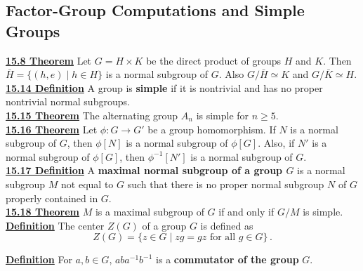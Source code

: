 \documentclass[12pt, letterpaper]{article}
\begin{document}
\subsection{Factor-Group Computations and Simple Groups}

\noindent \underline{\bf 15.8 Theorem} Let $G = H \times K$ be the direct product of groups $H$ and $K$. Then $\bar{H} = \{(h,e) \; | \; h \in H\}$ is a normal subgroup of $G$. Also $G / \bar{H} \simeq K$ and $G / \bar{K} \simeq H$. \\

\noindent \underline{\bf 15.14 Definition} A group is {\bf simple} if it is nontrivial and has no proper nontrivial normal subgroups. \\

\noindent \underline{\bf 15.15 Theorem} The alternating group $A_n$ is simple for $n \geq 5$. \\

\noindent \underline{\bf 15.16 Theorem} Let $\phi : G \rightarrow G'$ be a group homomorphism. If $N$ is a normal subgroup of $G$, then $\phi[N]$ is a normal subgroup of $\phi[G]$. Also, if $N'$ is a normal subgroup of $\phi[G]$, then $\phi^{-1}[N']$ is a normal subgroup of $G$.  \\

\noindent \underline{\bf 15.17 Definition} A {\bf maximal normal subgroup of a group $G$} is a normal subgroup $M$ not equal to $G$ such that there is no proper normal subgroup $N$ of $G$ properly contained in $G$. \\

\noindent \underline{\bf 15.18 Theorem} $M$ is a maximal subgroup of $G$ if and only if $G / M$ is simple. \\

\noindent \underline{\bf Definition} The center $Z(G)$ of a group $G$ is defined as $$Z(G) = \{z \in G \; | \; zg = gz \mbox{ for all } g \in G\}\,.$$

\noindent \underline{\bf Definition} For $a,b \in G$, $aba^{-1}b^{-1}$ is a {\bf commutator of the group} $G$. 
\end{document}
